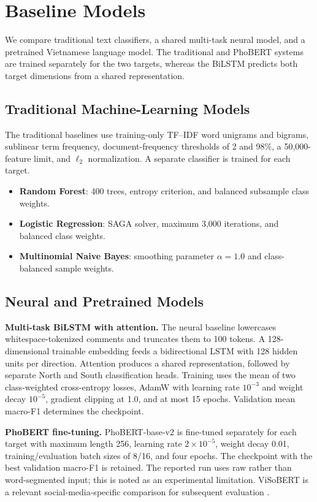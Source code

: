 \documentclass[11pt]{article}
\begin{document}
\section{Baseline Models}

We compare traditional text classifiers, a shared multi-task neural model, and a pretrained Vietnamese language model. The traditional and PhoBERT systems are trained separately for the two targets, whereas the BiLSTM predicts both target dimensions from a shared representation.

\subsection{Traditional Machine-Learning Models}

The traditional baselines use training-only TF--IDF word unigrams and bigrams, sublinear term frequency, document-frequency thresholds of 2 and 98\%, a 50,000-feature limit, and $\ell_2$ normalization. A separate classifier is trained for each target.

\begin{itemize}[leftmargin=1.5em]
  \item \textbf{Random Forest}: 400 trees, entropy criterion, and balanced subsample class weights.
  \item \textbf{Logistic Regression}: SAGA solver, maximum 3,000 iterations, and balanced class weights.
  \item \textbf{Multinomial Naive Bayes}: smoothing parameter $\alpha=1.0$ and class-balanced sample weights.
\end{itemize}

\subsection{Neural and Pretrained Models}

\textbf{Multi-task BiLSTM with attention.}
The neural baseline lowercases whitespace-tokenized comments and truncates them to 100 tokens. A 128-dimensional trainable embedding feeds a bidirectional LSTM with 128 hidden units per direction. Attention produces a shared representation, followed by separate North and South classification heads. Training uses the mean of two class-weighted cross-entropy losses, AdamW with learning rate $10^{-3}$ and weight decay $10^{-5}$, gradient clipping at 1.0, and at most 15 epochs. Validation mean macro-F1 determines the checkpoint.

\textbf{PhoBERT fine-tuning.}
PhoBERT-base-v2 \cite{nguyen2020phobert} is fine-tuned separately for each target with maximum length 256, learning rate $2\times10^{-5}$, weight decay 0.01, training/evaluation batch sizes of 8/16, and four epochs. The checkpoint with the best validation macro-F1 is retained. The reported run uses raw rather than word-segmented input; this is noted as an experimental limitation. ViSoBERT is a relevant social-media-specific comparison for subsequent evaluation \cite{nguyen2023visobert}.
\end{document}

